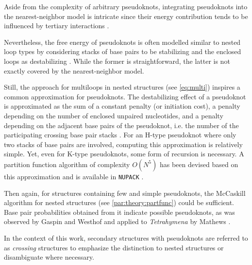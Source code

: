 \documentclass[../../master.tex]{subfiles}
\begin{document}
Aside from the complexity of arbitrary pseudoknots, integrating pseudoknots into the nearest-neighbor model is intricate since their energy contribution tends to be influenced by tertiary interactions \parencite{liu_fluorescence_2010}.

Nevertheless, the free energy of pseudoknots is often modelled similar to nested loop types by considering stacks of base pairs to be stabilizing and the enclosed loops as destabilizing \parencite{gultyaev_approximation_1999}.
While the former is straightforward, the latter is not exactly covered by the nearest-neighbor model.

Still,  the approach for multiloops in nested structures (see \autoref{eq:multi}) inspires a common approximation for pseudoknots. 
The destabilizing effect of a pseudoknot is approximated as the sum of a constant penalty (or initiation cost), a penalty depending on the number of enclosed unpaired nucleotides, and a penalty depending on the adjacent base pairs of the pseudoknot, i.e. the number of the participating crossing base pair stacks \parencite{dirks_partition_2003}.
For an H-type pseudoknot where only two stacks of base pairs are involved, computing this approximation is relatively simple.
Yet, even for K-type pseudoknots, some form of recursion is necessary.
A partition function algorithm of complexity $O(N^5)$ has been devised based on this approximation and is  available in \texttt{NUPACK} \parencite{dirks_partition_2003, zadeh_nupack_2011}.

Then again, for structures containing few and simple pseudoknots, the McCaskill algorithm for nested structures (see \autoref{par:theory:partfunc}) could be sufficient. 
Base pair probabilities obtained from it indicate possible pseudoknots, as was observed by Gaspin and Westhof and applied to \textit{Tetrahymena} by Mathews \parencite{gaspin_interactive_1995, mathews_using_2004}.

In the context of this work, secondary structures with pseudoknots are referred to as \emph{crossing} structures to emphasize the distinction to nested structures or disambiguate where necessary.
\end{document}
